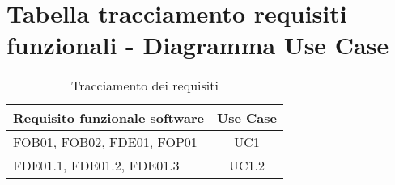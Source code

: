 \section{Tabella tracciamento requisiti funzionali - Diagramma Use Case}
	\begin{table}[H]
			\centering
			\begin{tabularx}{\textwidth}{|R|c|}
			\hline
			\textbf{Requisito funzionale software} & \textbf{Use Case} \\
			\hline
			FOB01, FOB02, FDE01, FOP01  & UC1 \\
			FDE01.1, FDE01.2, FDE01.3  & UC1.2 \\
			\hline
			\end{tabularx}
			\caption{Tracciamento dei requisiti}
			\label{T01}
	\end{table}